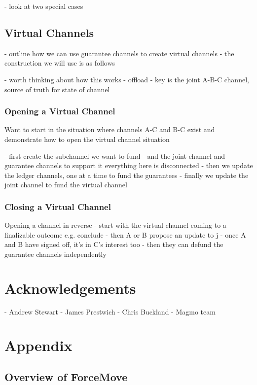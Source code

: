 \documentclass{article}
\theoremstyle{definition}
\begin{document}
  - look at two special cases

\subsection{Virtual Channels}

- outline how we can use guarantee channels to create virtual channels
- the construction we will use is as follows



- worth thinking about how this works
- offload
- key is the joint A-B-C channel, source of truth for state of channel


\subsubsection{Opening a Virtual Channel}

Want to start in the situation where channels A-C and B-C exist and demonstrate how to
open the virtual channel situation

- first create the subchannel we want to fund
- and the joint channel and guarantee channels to support it
everything here is disconnected
- then we update the ledger channels, one at a time to fund the guarantees
- finally we update the joint channel to fund the virtual channel

\subsubsection{Closing a Virtual Channel}

Opening a channel in reverse
- start with the virtual channel coming to a finalizable outcome e.g. conclude
- then A or B propose an update to j
- once A and B have signed off, it's in C's interest too
- then they can defund the guarantee channels independently


\section{Acknowledgements}

- Andrew Stewart
- James Prestwich
- Chris Buckland
- Magmo team


\section{Appendix}

\subsection{Overview of ForceMove}
\end{document}
